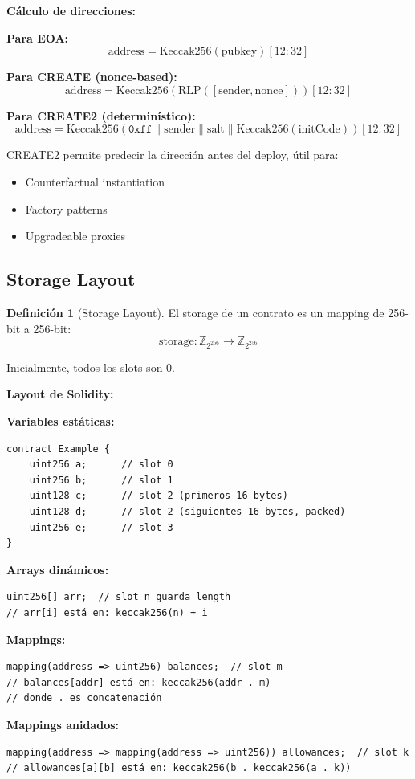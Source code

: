 \documentclass[11pt,a4paper,twoside,openright]{book}
\theoremstyle{definition}
\newtheorem{definition}{Definición}[chapter]
\theoremstyle{plain}
\theoremstyle{remark}
\begin{document}
\begin{mathnote}
\textbf{Cálculo de direcciones:}

\textbf{Para EOA:}
\[ \text{address} = \text{Keccak256}(\text{pubkey})[12:32] \]

\textbf{Para CREATE (nonce-based):}
\[ \text{address} = \text{Keccak256}(\text{RLP}([\text{sender}, \text{nonce}]))[12:32] \]

\textbf{Para CREATE2 (determinístico):}
\[ \text{address} = \text{Keccak256}(\texttt{0xff} \| \text{sender} \| \text{salt} \| \text{Keccak256}(\text{initCode}))[12:32] \]

CREATE2 permite predecir la dirección antes del deploy, útil para:
\begin{itemize}
    \item Counterfactual instantiation
    \item Factory patterns
    \item Upgradeable proxies
\end{itemize}
\end{mathnote}

\subsection{Storage Layout}

\begin{definition}[Storage Layout]
El storage de un contrato es un mapping de 256-bit a 256-bit:
\[ \text{storage}: \mathbb{Z}_{2^{256}} \to \mathbb{Z}_{2^{256}} \]

Inicialmente, todos los slots son 0.
\end{definition}

\begin{keyidea}
\textbf{Layout de Solidity:}

\textbf{Variables estáticas:}
\begin{verbatim}
contract Example {
    uint256 a;      // slot 0
    uint256 b;      // slot 1
    uint128 c;      // slot 2 (primeros 16 bytes)
    uint128 d;      // slot 2 (siguientes 16 bytes, packed)
    uint256 e;      // slot 3
}
\end{verbatim}

\textbf{Arrays dinámicos:}
\begin{verbatim}
uint256[] arr;  // slot n guarda length
// arr[i] está en: keccak256(n) + i
\end{verbatim}

\textbf{Mappings:}
\begin{verbatim}
mapping(address => uint256) balances;  // slot m
// balances[addr] está en: keccak256(addr . m)
// donde . es concatenación
\end{verbatim}

\textbf{Mappings anidados:}
\begin{verbatim}
mapping(address => mapping(address => uint256)) allowances;  // slot k
// allowances[a][b] está en: keccak256(b . keccak256(a . k))
\end{verbatim}
\end{keyidea}
\end{document}
